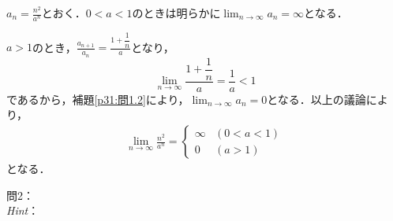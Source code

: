 \documentclass[dvipdfmx,uplatex,11pt]{jsarticle}
\theoremstyle{definition}
\begin{document}
%
\begin{leftbar}
        $a_n = \frac{n^2}{a^n}$とおく．$0<a<1$のときは明らかに$\lim_{n \to \infty} a_n=\infty$となる．\par 
        $a>1$のとき，$\frac{a_{n+1}}{a_n} =\frac{1+\dfrac{1}{n}}{a}$となり，
        \[
            \lim_{n \to \infty} \frac{1+\dfrac{1}{n}}{a} = \frac{1}{a} <1
        \]
        であるから，補題\ref{p31:問1.2}により，$\lim_{n \to \infty} a_n =0$となる．以上の議論により，
        \begin{align*}
            \lim_{n \to \infty} \frac{n^2}{a^n}
            =
            \begin{cases}
                \infty & (0<a<1) \\
                0 & (a>1)
            \end{cases}
        \end{align*}
        となる．
	\end{leftbar}
	\newpage
\noindent
問2：
\\
\textsl{Hint}：\\
\dotfill
\end{document}
